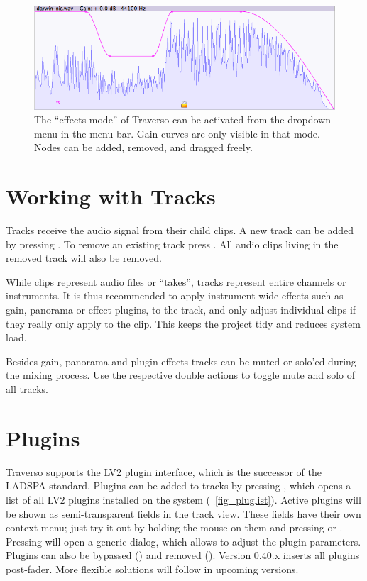 \begin{figure}[t]
 \centering\includegraphics[width=\textwidth]{../images/gcurve01}
 \caption{The ``effects mode'' of Traverso can be activated from the dropdown menu in the menu bar. Gain curves are only visible in that mode. Nodes can be added, removed, and dragged freely.}
 \label{fig_gcurve01}
\end{figure}

\section{Working with Tracks}
Tracks receive the audio signal from their child clips. A new track can be added by pressing . To remove an existing track press . All audio clips living in the removed track will also be removed.

While clips represent audio files or ``takes'', tracks represent entire channels or instruments. It is thus recommended to apply instrument-wide effects such as gain, panorama or effect plugins, to the track, and only adjust individual clips if they really only apply to the clip. This keeps the project tidy and reduces system load.

Besides gain, panorama and plugin effects tracks can be muted  or solo'ed  during the mixing process. Use the respective double actions \dact{} to toggle mute and solo of all tracks.

\section{Plugins}
Traverso supports the LV2 plugin interface, which is the successor of the LADSPA standard. Plugins can be added to tracks by pressing , which opens a list of all LV2 plugins installed on the system (\FigB~\ref{fig_pluglist}). Active plugins will be shown as semi-transparent fields in the track view. These fields have their own context menu; just try it out by holding the mouse on them and pressing  or . Pressing  will open a generic dialog, which allows to adjust the plugin parameters. Plugins can also be bypassed () and removed (). Version 0.40.x inserts all plugins post-fader. More flexible solutions will follow in upcoming versions.

